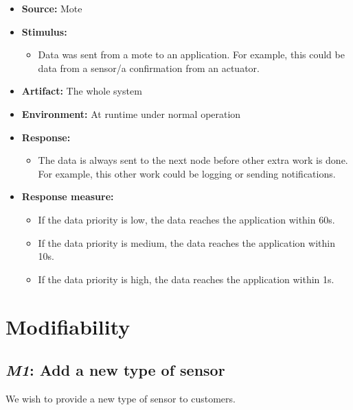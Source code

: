 \documentclass[english]{sareport}
\begin{document}
\begin{itemize}
    \item \textbf{Source:} Mote
    \item \textbf{Stimulus:}
        \begin{itemize}
            \item Data was sent from a mote to an application. For example,
                  this could be data from a sensor/a confirmation from an actuator.
        \end{itemize}

    \item \textbf{Artifact:} The whole system
    \item \textbf{Environment:} At runtime under normal operation
    \item \textbf{Response:}
        \begin{itemize}
            \item The data is always sent to the next node before other extra
                  work is done. For example, this other work could be logging
                  or sending notifications.
        \end{itemize}

    \item \textbf{Response measure:}
        \begin{itemize}
            \item If the data priority is low, the data reaches the application
            within 60s.
            \item If the data priority is medium, the data reaches the application
            within 10s.
            \item If the data priority is high, the data reaches the application
            within 1s.
        \end{itemize}
\end{itemize}

\section{Modifiability}
\subsection{\emph{M1}: Add a new type of sensor}
We wish to provide a new type of sensor to customers.
\end{document}
